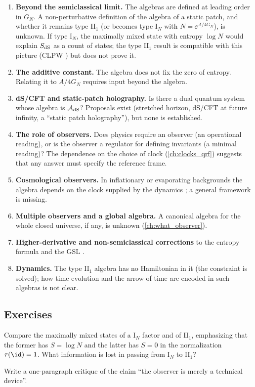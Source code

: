 \begin{enumerate}
\item \textbf{Beyond the semiclassical limit.} The algebras are defined at leading order in $G_N$. A non-perturbative definition of the algebra of a static patch, and whether it remains type II$_1$ (or becomes type I$_N$ with $N=\ee^{A/4G_N}$), is unknown. If type I$_N$, the maximally mixed state with entropy $\log N$ would explain $S_{\rm dS}$ as a count of states; the type II$_1$ result is compatible with this picture (CLPW \cite{CLPW2023}) but does not prove it.
\item \textbf{The additive constant.} The algebra does not fix the zero of entropy. Relating it to $A/4G_N$ requires input beyond the algebra.
\item \textbf{dS/CFT and static-patch holography.} Is there a dual quantum system whose algebra is $\mathcal{A}_{\rm dS}$? Proposals exist (stretched horizon, dS/CFT at future infinity, a ``static patch holography''), but none is established.
\item \textbf{The role of observers.} Does physics require an observer (an operational reading), or is the observer a regulator for defining invariants (a minimal reading)? The dependence on the choice of clock (\cref{ch:clocks_qrf}) suggests that any answer must specify the reference frame.
\item \textbf{Cosmological observers.} In inflationary or evaporating backgrounds the algebra depends on the clock supplied by the dynamics \cite{ChenPenington2024}; a general framework is missing.
\item \textbf{Multiple observers and a global algebra.} A canonical algebra for the whole closed universe, if any, is unknown (\cref{ch:what_observer}).
\item \textbf{Higher-derivative and non-semiclassical corrections} to the entropy formula and the GSL \cite{FaulknerSperanza2024}.
\item \textbf{Dynamics.} The type II$_1$ algebra has no Hamiltonian in it (the constraint is solved); how time evolution and the arrow of time are encoded in such algebras is not clear.
\end{enumerate}

\subsection*{Exercises}
\begin{exercise}\label{ex:open_ds:1}
Compare the maximally mixed states of a I$_N$ factor and of II$_1$, emphasizing that the former has $S=\log N$ and the latter has $S=0$ in the normalization $\tau(\id)=1$. What information is lost in passing from I$_N$ to II$_1$?
\end{exercise}
\begin{exercise}\label{ex:open_ds:2}
Write a one-paragraph critique of the claim ``the observer is merely a technical device''.
\end{exercise}

